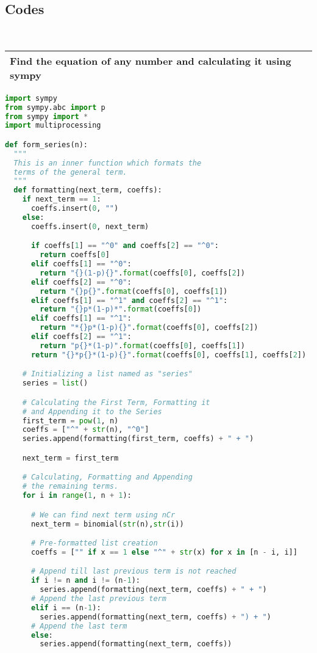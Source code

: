 \subsection*{Codes}
\\
\begin{tabular}{p{17cm}}
\toprule
\textbf{Find the equation of any number and calculating it using sympy}\\
\bottomrule
\end{tabular}
\begin{lstlisting}[language=Python]
import sympy
from sympy.abc import p
from sympy import *
import multiprocessing

def form_series(n):
  """
  This is an inner function which formats the
  terms of the general term.
  """
  def formatting(next_term, coeffs):
    if next_term == 1:
      coeffs.insert(0, "")
    else:
      coeffs.insert(0, next_term)

      if coeffs[1] == "^0" and coeffs[2] == "^0":
        return coeffs[0]
      elif coeffs[1] == "^0":
        return "{}(1-p){}".format(coeffs[0], coeffs[2])
      elif coeffs[2] == "^0":
        return "{}p{}".format(coeffs[0], coeffs[1])
      elif coeffs[1] == "^1" and coeffs[2] == "^1":
        return "{}p*(1-p)*".format(coeffs[0])
      elif coeffs[1] == "^1":
        return "*{}p*(1-p){}".format(coeffs[0], coeffs[2])
      elif coeffs[2] == "^1":
        return "p{}*(1-p)".format(coeffs[0], coeffs[1])
      return "{}*p{}*(1-p){}".format(coeffs[0], coeffs[1], coeffs[2])

    # Initializing a list named as "series"
    series = list()

    # Calculating the First Term, Formatting it
    # and Appending it to the Series
    first_term = pow(1, n)
    coeffs = ["^" + str(n), "^0"]
    series.append(formatting(first_term, coeffs) + " + ")

    next_term = first_term

    # Calculating, Formatting and Appending
    # the remaining terms.
    for i in range(1, n + 1):

      # We can find next term using nCr
      next_term = binomial(str(n),str(i))

      # Pre-formatted list creation
      coeffs = ["" if x == 1 else "^" + str(x) for x in [n - i, i]]

      # Append till last previous term is not reached
      if i != n and i != (n-1):
        series.append(formatting(next_term, coeffs) + " + ")
      # Append the last previous term
      elif i == (n-1):
        series.append(formatting(next_term, coeffs) + ") + ")
      # Append the last term
      else:
        series.append(formatting(next_term, coeffs))


\end{lstlisting}
